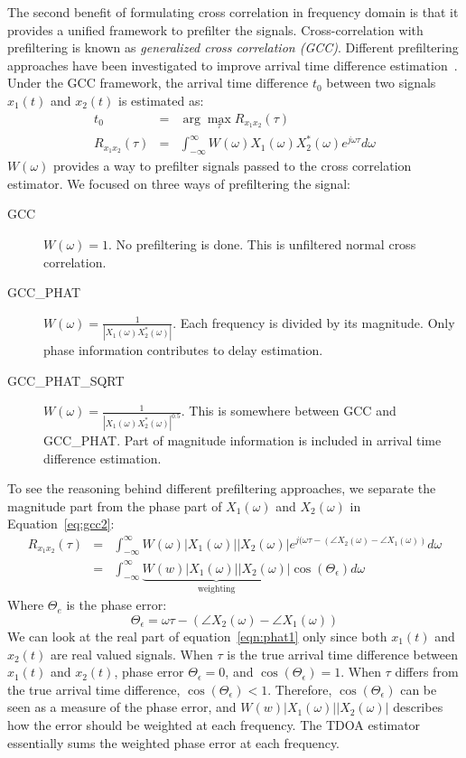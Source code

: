 The second benefit of formulating cross correlation in frequency domain is that it provides a unified framework to prefilter the signals. Cross-correlation with prefiltering is known as \emph{generalized cross correlation (GCC)}. Different prefiltering approaches have been investigated to improve arrival time difference estimation~\cite{tdoa:gcc1,tdoa:gcc2,tdoa:gcc3}. Under the GCC framework, the arrival time difference $t_0$ between two signals $x_1(t)$ and $x_2(t)$ is estimated as:
\begin{eqnarray} \label{eq:gcc}
t_0 &=& \arg\max_{\tau} R_{x_1x_2}(\tau) \\\label{eq:gcc2}
R_{x_1x_2}(\tau) &=& \int_{-\infty}^\infty W(\omega) X_1(\omega) X_2^{*}(\omega) e^{j\omega\tau} d\omega
\end{eqnarray}
$W(\omega)$ provides a way to prefilter signals passed to the cross correlation estimator. We focused on three ways of prefiltering the signal:
\begin{description}%
\item[GCC] $W(\omega) = 1$. No prefiltering is done. This is unfiltered normal cross correlation.
\item[GCC\_PHAT] $W(\omega) = \frac{1}{\left|X_1(\omega)X_2^{*}(\omega)\right|}$. Each frequency is divided by its magnitude. Only phase information contributes to delay estimation.
\item[GCC\_PHAT\_SQRT] $W(\omega) = \frac{1}{\left|X_1(\omega)X_2^*(\omega)\right|^{0.5}}$. This is somewhere between GCC and GCC\_PHAT. Part of magnitude information is included in arrival time difference estimation.
\end{description}

To see the reasoning behind different prefiltering approaches, we separate the magnitude part from the phase part of $X_1(\omega)$ and $X_2(\omega)$ in Equation~\ref{eq:gcc2}:
\begin{eqnarray}
\label{eqn:phat1}
R_{x_1x_2}(\tau) &=& \int_{-\infty}^\infty W(\omega) |X_1(\omega)||X_2(\omega)| e^{j(\omega\tau - (\angle{X_2(\omega)} - \angle{X_1(\omega)}) } d\omega\\
&=& \int_{-\infty}^\infty \underbrace{W(w)|X_1(\omega)| |X_2(\omega)|}_{\mbox{weighting}} \cos(\Theta_\epsilon) d\omega
\end{eqnarray}
Where $\Theta_{e}$ is the phase error:
\[
\Theta_\epsilon = \omega\tau - (\angle X_2(\omega) - \angle X_1(\omega))
\]
We can look at the real part of equation~\ref{eqn:phat1} only since both $x_1(t)$ and $x_2(t)$ are real valued signals. When $\tau$ is the true arrival time difference between $x_1(t)$ and $x_2(t)$, phase error $\Theta_\epsilon  = 0$, and $\cos(\Theta_\epsilon) = 1$. When $\tau$ differs from the true arrival time difference, $\cos(\Theta_\epsilon) < 1$. Therefore, $\cos(\Theta_\epsilon)$ can be seen as a measure of the phase error, and $W(w)|X_1(\omega)||X_2(\omega)|$ describes how the error should be weighted at each frequency. The TDOA estimator essentially sums the weighted phase error at each frequency. 


